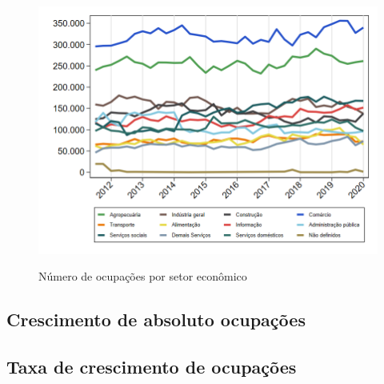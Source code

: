 \documentclass[10pt]{beamer}
\begin{document}
\begin{frame}
\textit{\hyperlink{indice_principal_amz_mt}{}}
\begin{figure}
  \centering
  \includegraphics[width=.85\linewidth]{./../analysis/output/_amz_mt_importancia_relativa.png}
  \label{_amz_mt_importancia_relativa}
  \caption{{Número de ocupações por setor econômico}}
\end{figure}
\end{frame}

\subsection{Crescimento de absoluto ocupações}

\begin{frame}
\textit{\hyperlink{indice_principal_amz_mt}{}}

\end{frame}


\begin{frame}
\textit{\hyperlink{indice_principal_amz_mt}{}}

\end{frame}


\begin{frame}
\textit{\hyperlink{indice_principal_amz_mt}{}}

\end{frame}

\subsection{Taxa de crescimento de ocupações}
\end{document}
